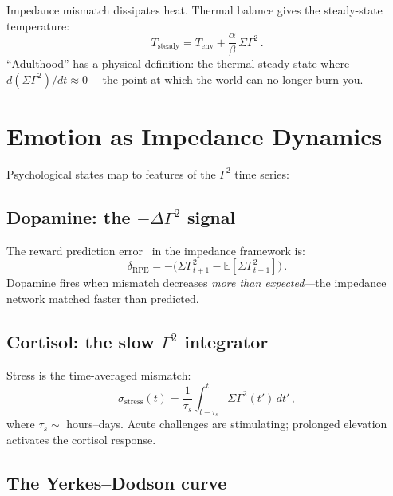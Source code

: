 \documentclass[aps,pre,twocolumn,superscriptaddress,floatfix]{revtex4-2}
\begin{document}
Impedance mismatch dissipates heat.
Thermal balance gives the steady-state temperature:
\begin{equation}
  T_{\mathrm{steady}} = T_{\mathrm{env}}
    + \frac{\alpha}{\beta}\,\Sigma\Gamma^2\,.
  \label{eq:equilibrium}
\end{equation}
``Adulthood'' has a physical definition:
the thermal steady state where $d(\Sigma\Gamma^2)/dt \approx 0$
---the point at which the world can no longer burn you.


\section{Emotion as Impedance Dynamics}
\label{sec:emotion}

Psychological states map to features of the $\Gamma^2$
time series:

\subsection{Dopamine: the $-\Delta\Gamma^2$ signal}

The reward prediction error~\cite{Schultz1997} in
the impedance framework is:
\begin{equation}
  \delta_{\mathrm{RPE}} = -\bigl(\Sigma\Gamma^2_{t+1}
    - \mathbb{E}[\Sigma\Gamma^2_{t+1}]\bigr)\,.
  \label{eq:rpe}
\end{equation}
Dopamine fires when mismatch decreases \emph{more than
expected}---the impedance network matched faster
than predicted.

\subsection{Cortisol: the slow $\Gamma^2$ integrator}

Stress is the time-averaged mismatch:
\begin{equation}
  \sigma_{\mathrm{stress}}(t) =
    \frac{1}{\tau_s} \int_{t-\tau_s}^{t}
    \Sigma\Gamma^2(t')\,dt'\,,
  \label{eq:cortisol}
\end{equation}
where $\tau_s \sim$ hours--days.
Acute challenges are stimulating; prolonged elevation
activates the cortisol response.

\subsection{The Yerkes--Dodson curve}
\end{document}
